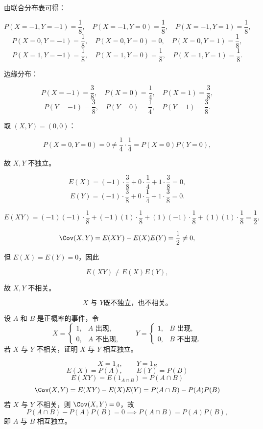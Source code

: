 \begin{solution}

由联合分布表可得：

\[
P(X=-1,Y=-1)=\frac18,\quad P(X=-1,Y=0)=\frac18,\quad P(X=-1,Y=1)=\frac18,
\]
\[
P(X=0,Y=-1)=\frac18,\quad P(X=0,Y=0)=0,\quad P(X=0,Y=1)=\frac18,
\]
\[
P(X=1,Y=-1)=\frac18,\quad P(X=1,Y=0)=\frac18,\quad P(X=1,Y=1)=\frac18.
\]

边缘分布：

\[
P(X=-1)=\frac38,\quad P(X=0)=\frac14,\quad P(X=1)=\frac38,
\]
\[
P(Y=-1)=\frac38,\quad P(Y=0)=\frac14,\quad P(Y=1)=\frac38.
\]

取 \((X,Y)=(0,0)\)：

\[
P(X=0,Y=0)=0 \neq \frac14\cdot\frac14=P(X=0)P(Y=0),
\]

故 \(X,Y\) 不独立。

\[
E(X)=(-1)\cdot\frac38+0\cdot\frac14+1\cdot\frac38=0,
\]
\[
E(Y)=(-1)\cdot\frac38+0\cdot\frac14+1\cdot\frac38=0.
\]

\[
E(XY)=(-1)(-1)\cdot\frac18+(-1)(1)\cdot\frac18+(1)(-1)\cdot\frac18+(1)(1)\cdot\frac18=\frac12,
\]

\[
\Cov(X,Y)=E(XY)-E(X)E(Y)=\frac12\neq 0,
\]

但 \(E(X)=E(Y)=0\)，因此

\[
E(XY) \neq E(X)E(Y),
\]

故 \(X,Y\) 不相关。

\[
\boxed{X \text{ 与 } Y \text{既不独立，也不相关。}}
\]

\end{solution}
\begin{homework}[3.26]
设 $A$ 和 $B$ 是正概率的事件，令
\[
X =
\begin{cases}
1, & A \text{ 出现}, \\
0, & A \text{ 不出现},
\end{cases}
\qquad
Y =
\begin{cases}
1, & B \text{ 出现}, \\
0, & B \text{ 不出现}.
\end{cases}
\]
若 $X$ 与 $Y$ 不相关，证明 $X$ 与 $Y$ 相互独立。
\end{homework}
\begin{solution}
\[
X=1_A,\qquad Y=1_B
\]
\[
E(X)=P(A),\qquad E(Y)=P(B)
\]
\[
E(XY)=E(1_{A\cap B})=P(A\cap B)
\]
\[
\Cov(X,Y)=E(XY)-E(X)E(Y)=P(A\cap B)-P(A)P(B)
\]
若 \(X\) 与 \(Y\) 不相关，则 \(\Cov(X,Y)=0\)，故
\[
P(A\cap B)-P(A)P(B)=0\implies P(A\cap B)=P(A)P(B),
\]
即 \(A\) 与 \(B\) 相互独立。 
\end{solution}
